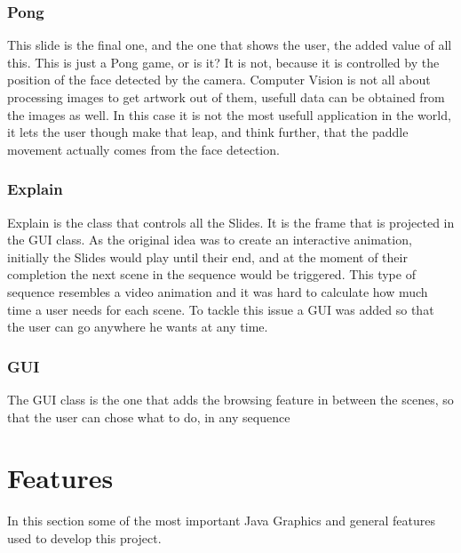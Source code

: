 \documentclass[a4paper, 11pt]{paper}
\begin{document}
\subsubsection{Pong}
\indent\par
This slide is the final one, and the one that shows the user, the added value of all this. This is just a Pong game, or is it?
It is not, because it is controlled by the position of the face detected by the camera. Computer Vision is not
all about processing images to get artwork out of them, usefull data can be obtained from the images as well.
In this case it is not the most usefull application in the world, it lets the user though make that leap, and think further, that
the paddle movement actually comes from the face detection.\\
\subsubsection{Explain}
\indent\par
Explain is the class that controls all the Slides. It is the frame that is projected in the GUI class. As the original idea was
to create an interactive animation, initially the Slides would play until their end, and at the moment of their completion
the next scene in the sequence would be triggered. This type of sequence resembles a video animation and it was hard to calculate
how much time a user needs for each scene. To tackle this issue a GUI was added so that the user can go anywhere he wants at any time.\\
\subsubsection{GUI}
\indent\par
The GUI class is the one that adds the browsing feature in between the scenes, so that the user can
chose what to do, in any sequence\\
\section{Features}
\indent\par
In this section some of the most important Java Graphics and general
features used to develop this project.\\
\end{document}
